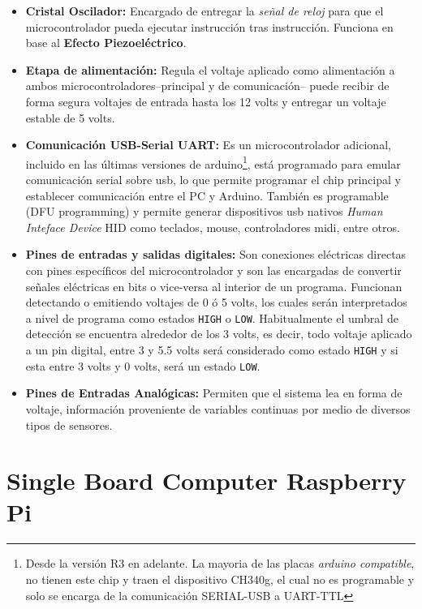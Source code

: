 \documentclass[letterpaper, 10pt]{report}
\begin{document}
		
		\begin{itemize}

			\item {\bf Cristal Oscilador:} Encargado de entregar la  \emph{señal de reloj} para que el microcontrolador pueda ejecutar instrucción tras instrucción. Funciona en base al \textbf{Efecto Piezoeléctrico}.
			\item {\bf Etapa de alimentación:} Regula el voltaje aplicado como alimentación a ambos microcontroladores--principal y de comunicación-- puede  recibir de forma segura voltajes de entrada hasta los 12 volts y entregar un voltaje estable de 5 volts.
		  
			\item {\bf Comunicación USB-Serial UART:} Es un microcontrolador adicional, incluido en las últimas versiones de arduino\footnote{Desde la versión R3 en adelante. La mayoria de las placas \emph{arduino compatible}, no tienen este chip y traen el dispositivo CH340g, el cual no es programable y solo se encarga de la comunicación SERIAL-USB a UART-TTL}, está programado para emular comunicación serial sobre usb, lo que permite programar el chip principal y establecer comunicación entre el PC y Arduino. También es programable (DFU programming) y permite generar dispositivos usb nativos \emph{Human Inteface Device} HID como teclados, mouse, controladores midi, entre otros.
			
			\item \textbf{Pines de entradas y salidas digitales: } Son conexiones eléctricas directas con pines específicos del microcontrolador y son las encargadas de convertir señales eléctricas en bits o vice-versa al interior de un programa. Funcionan detectando o emitiendo voltajes de 0 ó 5 volts, los cuales serán interpretados a nivel de programa como estados \texttt{HIGH} o \texttt{LOW}. Habitualmente el umbral de detección se encuentra alrededor de los 3 volts, es decir, todo voltaje aplicado a un pin digital, entre 3 y 5.5 volts será considerado como estado \texttt{HIGH} y si esta entre 3 volts y 0 volts, será un estado \texttt{LOW}. \cite{atmegaDatasheet}
			
			\item {\bf Pines de Entradas Analógicas:} Permiten que el sistema lea en forma de voltaje, información proveniente de variables continuas por medio de diversos tipos de sensores. 
		\end{itemize}
		
\section{Single Board Computer Raspberry Pi}
\end{document}
